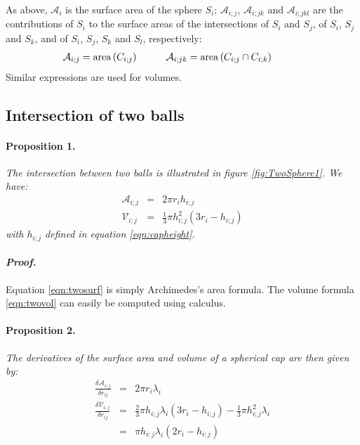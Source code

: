 \documentclass[11 pt]{article}
\newcommand {\mm}[1] {\ifmmode{#1}\else{\mbox{\(#1\)}}\fi}
\theoremstyle{plain} \theorembodyfont{\rmfamily}
\newcommand{\Area}[1]       {\mm{\rm area\,}{#1}}
\begin{document}
As above, $\mathcal{A}_i$ is the surface area of the sphere $S_i$; $\mathcal{A}_{i;j}$, $\mathcal{A}_{i;jk}$ and $\mathcal{A}_{i;jkl}$ are the contributions of $S_i$ to the surface areas of the intersections of $S_i$ and $S_j$, of $S_i$, $S_j$ and $S_k$, and of $S_i$, $S_j$, $S_k$ and $S_l$, respectively:
\begin{eqnarray*}
\mathcal{A}_{i;j} = \Area{(C_{i;j})} \quad \quad \quad
\mathcal{A}_{i;jk} = \Area{(C_{i;j} \cap C_{i;k})} \quad \quad \quad
\end{eqnarray*}
Similar expressions are used for volumes.

\subsection*{Intersection of two balls} 

\paragraph{Proposition 1.} \emph{The intersection between two balls is illustrated in figure \ref{fig:TwoSphere1}. We have:}
\begin{eqnarray}
\mathcal{A}_{i;j} &=& 2 \pi r_i h_{i;j} \label{eqn:twosurf}\\
\mathcal{V}_{i;j} &=& \frac{1}{3} \pi h_{i;j}^2 (3r_i - h_{i;j}) \label{eqn:twovol}
\end{eqnarray}
\emph{with $h_{i;j}$ defined in equation \ref{eqn:capheight}.}

 \paragraph{\emph{Proof.} }
 Equation \ref{eqn:twosurf} is simply Archimedes's area formula. The volume formula \ref{eqn:twovol} can easily be computed using calculus.
 
 \paragraph{Proposition 2.} \emph{The derivatives of the surface area and volume of a spherical cap are then given by:}
 \begin{eqnarray}
\frac{\delta \mathcal{A}_{i;j}}{\delta r_{ij}}  &=& 2 \pi r_i \lambda_i \label{eqn:twosurfder}\\
\frac{\delta\mathcal{V}_{i;j} }{\delta r_{ij}} &=& \frac{2}{3} \pi h_{i;j} \lambda_i (3r_i - h_{i;j}) - \frac{1}{3} \pi h_{i;j}^2 \lambda_i \nonumber \\
&=&  \pi h_{i:j} \lambda_i (2r_i - h_{i:j}) \label{eqn:twovol}
\end{eqnarray}
\end{document}
